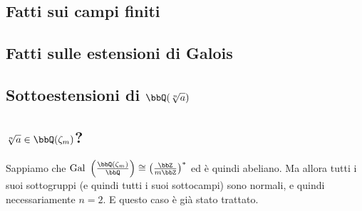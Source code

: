 \documentclass[a4paper,NoNotes,GeneralMath]{stdmdoc}
\newcommand{\Gal}{\text{Gal }}
\begin{document}
	\subsection{Fatti sui campi finiti}
	
	\subsection{Fatti sulle estensioni di Galois}
	
	\subsection{Sottoestensioni di $\bbQ(\sqrt[n]{a})$}
	
	\subsection{$\sqrt[n]{a} \in \bbQ(\zeta_m)$?}
	Sappiamo che $\Gal \left( \frac{\bbQ(\zeta_m)}{\bbQ} \right) \cong \left( \frac{\bbZ}{m\bbZ} \right) ^{*}$ ed è quindi abeliano. Ma allora tutti i suoi sottogruppi (e quindi tutti i suoi sottocampi) sono normali, e quindi necessariamente $n = 2$. E questo caso è già stato trattato.
\end{document}
